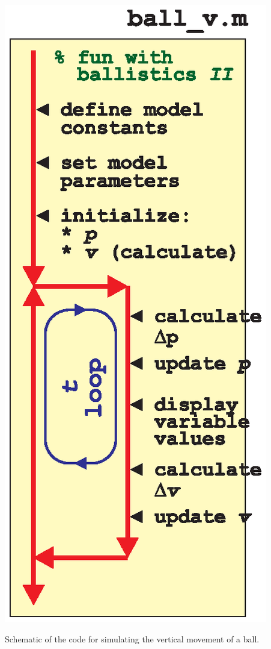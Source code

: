 \documentclass{tufte-book} %
\begin{document}
\begin{marginfigure}[1.25in]
\includegraphics[width=\linewidth]{ch9-schematic-ball_v.eps}
\caption{Schematic of the code for simulating the vertical movement of a ball.}
\label{fig:ch9-schematic-ball_v}
\end{marginfigure}
\end{document}
